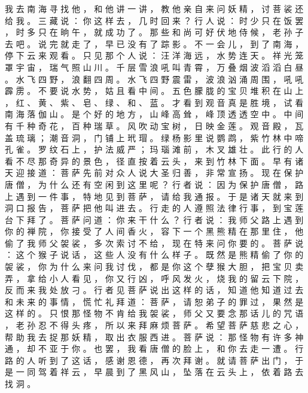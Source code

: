 {我 去 南 海 寻 找 他 ， 和 他 讲 一 讲 ， 教 他 亲 自 来 问 妖 精 ， 讨 菩 裟 还 给 我 。
三 藏 说 ： 你 这 样 去 ， 几 时 回 来 ？ 行 人 说 ： 时 少 只 在 饭 罢 ， 时 多 只 在 晌 午 ， 就 成 功 了 。
那 些 和 尚 可 好 伏 地 侍 候 ， 老 孙 子 去 吧 。
说 完 就 走 了 ， 早 已 没 有 了 踪 影 。
不 一 会 儿 ， 到 了 南 海 ， 停 下 云 来 观 看 。
只 见 那 个 人 说 ： 汪 洋 海 远 ， 水 势 连 天 。
祥 光 笼 罩 宇 宙 ， 瑞 气 照 山 川 。
千 层 雪 浪 吼 叫 青 霄 ， 万 叠 烟 波 滔 滔 白 昼 。
水 飞 四 野 ， 浪 翻 四 周 。
水 飞 四 野 震 雷 ， 波 浪 汹 涌 周 围 ， 吼 吼 霹 雳 。
不 要 说 水 势 ， 姑 且 看 中 间 。
五 色 朦 胧 的 宝 贝 堆 积 在 山 上 ， 红 、 黄 、 紫 、 皂 、 绿 、 和 、 蓝 。
才 看 到 观 音 真 是 胜 境 ， 试 看 南 海 落 伽 山 。
是 个 好 的 地 方 ， 山 峰 高 耸 ， 峰 顶 透 透 空 中 。
中 间 有 千 种 奇 花 ， 百 种 瑞 草 。
风 吹 动 宝 树 ， 日 映 金 莲 。
观 音 殿 ， 瓦 盖 琉 璃 ； 潮 音 洞 ， 门 铺 上 玳 瑁 。
绿 杨 影 里 说 鹦 鹉 ， 紫 竹 林 中 啼 孔 雀 。
罗 纹 石 上 ， 护 法 威 严 ； 玛 瑙 滩 前 ， 木 叉 雄 壮 。
此 行 的 人 看 不 尽 那 奇 异 的 景 色 ， 径 直 按 着 云 头 ， 来 到 竹 林 下 面 。
早 有 诸 天 迎 接 道 ： 菩 萨 先 前 对 众 人 说 大 圣 归 善 ， 非 常 宣 扬 。
现 在 保 护 唐 僧 ， 为 什 么 还 有 空 闲 到 这 里 呢 ？ 行 者 说 ： 因 为 保 护 唐 僧 ， 路 上 遇 到 一 件 事 ， 特 地 见 到 菩 萨 ， 请 给 我 通 报 。
于 是 诸 天 就 来 到 洞 口 报 告 ， 菩 萨 把 他 叫 进 去 。
行 走 的 人 遵 照 法 律 行 事 ， 到 宝 莲 台 下 拜 了 。
菩 萨 问 道 ： 你 来 干 什 么 ？ 行 者 说 ： 我 师 父 路 上 遇 到 你 的 禅 院 ， 你 接 受 了 人 间 香 火 ， 容 下 一 个 黑 熊 精 在 那 里 住 ， 他 偷 了 我 师 父 袈 裟 ， 多 次 索 讨 不 给 ， 现 在 特 来 问 你 要 的 。
菩 萨 说 ： 这 个 猴 子 说 话 ， 这 些 人 没 有 什 么 样 子 。
既 然 是 熊 精 偷 了 你 的 袈 裟 ， 你 为 什 么 来 问 我 讨 伐 ， 都 是 你 这 个 孽 猴 大 胆 ， 把 宝 贝 卖 弄 ， 拿 给 小 人 看 见 ， 你 又 行 凶 ， 呼 风 发 火 ， 烧 我 的 留 云 下 院 ， 反 而 来 我 处 放 刁 。
行 者 见 菩 萨 说 出 这 样 的 话 ， 知 道 他 知 道 过 去 和 未 来 的 事 情 ， 慌 忙 礼 拜 道 ： 菩 萨 ， 请 恕 弟 子 的 罪 过 ， 果 然 是 这 样 的 。
只 恨 那 怪 物 不 肯 给 我 袈 裟 ， 师 父 又 要 念 那 话 儿 的 咒 语 ， 老 孙 忍 不 得 头 疼 ， 所 以 来 拜 麻 烦 菩 萨 。
希 望 菩 萨 慈 悲 之 心 ， 帮 助 我 去 捉 那 妖 精 ， 取 出 衣 服 西 进 。
菩 萨 说 ： 那 怪 物 有 许 多 神 通 ， 却 不 亚 于 你 。
也 罢 ， 我 看 唐 僧 的 脸 上 ， 和 你 去 走 一 遭 。
行 路 的 人 听 到 了 这 话 ， 感 谢 恩 德 ， 再 次 拜 谢 。
就 请 菩 萨 出 门 ， 于 是 一 同 驾 着 祥 云 ， 早 晨 到 了 黑 风 山 ， 坠 落 在 云 头 上 ， 依 着 路 去 找 洞 。
}
